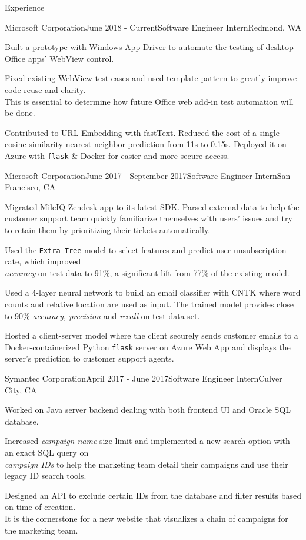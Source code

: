 \documentclass{resume} %
\begin{document}
\begin{rSection}{Experience}

\begin{rSubsection}{Microsoft Corporation}{June 2018 - Current}{Software Engineer Intern}{Redmond, WA}
\item Built a prototype with Windows App Driver to automate the testing of desktop Office apps' WebView control. \item Fixed existing WebView test cases and used template pattern to greatly improve code reuse and clarity.\\
This is essential to determine how future Office web add-in test automation will be done.
\item Contributed to URL Embedding with fastText. Reduced the cost of a single cosine-similarity nearest neighbor prediction from 11s to 0.15s. Deployed it on Azure with \texttt{flask} \& Docker for easier and more secure access.
\end{rSubsection}

\begin{rSubsection}{Microsoft Corporation}{June 2017 - September 2017}{Software Engineer Intern}{San Francisco, CA}
\item Migrated MileIQ Zendesk app to its latest SDK. Parsed external data to help the customer support team quickly familiarize themselves with users' issues and try to retain them by prioritizing their tickets automatically.
\item Used the \texttt{Extra-Tree} model to select features and predict user unsubscription rate, which improved\\
\textit{accuracy} on test data to 91\%, a significant lift from 77\% of the existing model.
\item Used a 4-layer neural network to build an email classifier with CNTK where word counts and relative location are used as input. The trained model provides close to 90\% \textit{accuracy, precision} and \textit{recall} on test data set.
\item Hosted a client-server model where the client securely sends customer emails to a Docker-containerized Python \texttt{flask} server on Azure Web App and displays the server's prediction to customer support agents.
\end{rSubsection}

\begin{rSubsection}{Symantec Corporation}{April 2017 - June 2017}{Software Engineer Intern}{Culver City, CA}
\item Worked on Java server backend dealing with both frontend UI and Oracle SQL database.
\item Increased \textit{campaign name} size limit and implemented a new search option with an exact SQL query on\\ 
\textit{campaign IDs} to help the marketing team detail their campaigns and use their legacy ID search tools.
\item Designed an API to exclude certain IDs from the database and filter results based on time of creation.\\
It is the cornerstone for a new website that visualizes a chain of campaigns for the marketing team.
\end{rSubsection}


\end{rSection}
\end{document}
